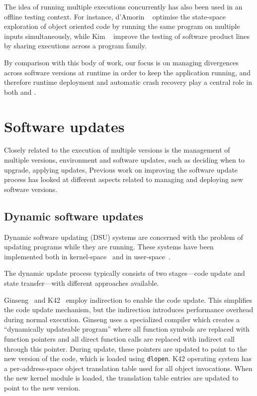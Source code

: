 The idea of running multiple executions concurrently has also been used in an
offline testing context.  For instance, d'Amorin \etal~\cite{delta-exec-oop}
optimise the state-space exploration of object oriented code by running the
same program on multiple inputs simultaneously, while Kim
\etal~\cite{shared-exec12} improve the testing of software product lines by
sharing executions across a program family.

By comparison with this body of work, our focus is on managing
divergences across software versions at runtime in order to keep the
application running, and therefore runtime deployment and automatic
crash recovery play a central role in both \mx and \nx.

\section{Software updates}

Closely related to the execution of multiple versions is the management of
multiple versions, environment and software updates, such as deciding when to
upgrade, applying updates, \etc Previous work on improving the software update
process has looked at different aspects related to managing and deploying new
software versions. 

\subsection{Dynamic software updates}

Dynamic software updating (DSU) systems are concerned with the problem of
updating programs while they are running. These systems have been implemented
both in kernel-space~\cite{k42,dynamos,ksplice,proteos} and in
user-space~\cite{opus,ginseng,polus,upstare,ekiden,kitsune}.

The dynamic update process typically consists of two stages---code update and
state transfer---with different approaches available.

Ginseng~\cite{ginseng} and K42~\cite{k42} employ indirection to enable the code
update. This simplifies the code update mechanism, but the indirection
introduces performance overhead during normal execution. Ginseng uses a
specialized compiler which creates a ``dynamically updateable program'' where
all function symbols are replaced with function pointers and all direct
function calls are replaced with indirect call through this pointer. During
update, these pointers are updated to point to the new version of the code,
which is loaded using \lstinline`dlopen`. K42 operating system has a
per-address-space object translation table used for all object invocations.
When the new kernel module is loaded, the translation table entries are updated
to point to the new version.

